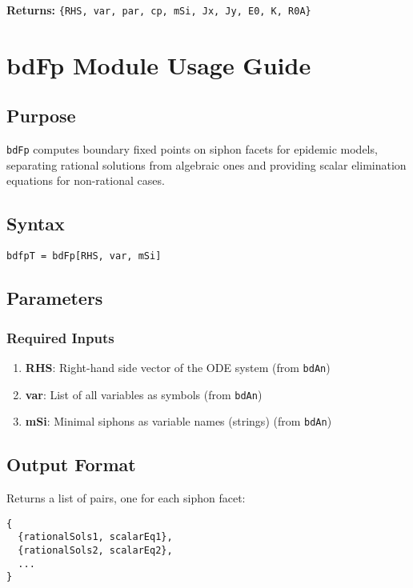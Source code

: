 \documentclass{article}
\begin{document}
\textbf{Returns:} \texttt{\{RHS, var, par, cp, mSi, Jx, Jy, E0, K, R0A\}}

\section{bdFp Module Usage Guide}

\subsection{Purpose}
\texttt{bdFp} computes boundary fixed points on siphon facets for epidemic models, separating rational solutions from algebraic ones and providing scalar elimination equations for non-rational cases.

\subsection{Syntax}
\begin{lstlisting}
bdfpT = bdFp[RHS, var, mSi]
\end{lstlisting}

\subsection{Parameters}

\subsubsection{Required Inputs}
\begin{enumerate}
\item \textbf{RHS}: Right-hand side vector of the ODE system (from \texttt{bdAn})
\item \textbf{var}: List of all variables as symbols (from \texttt{bdAn})
\item \textbf{mSi}: Minimal siphons as variable names (strings) (from \texttt{bdAn})
\end{enumerate}

\subsection{Output Format}
Returns a list of pairs, one for each siphon facet:
\begin{lstlisting}
{
  {rationalSols1, scalarEq1},
  {rationalSols2, scalarEq2},
  ...
}
\end{lstlisting}
\end{document}
